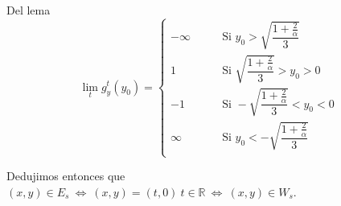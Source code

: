 \documentclass[11pt]{book}
\newcommand{\R}{{\mathbb{R}}}
\numberwithin{theorem}{subsection}
\newenvironment{proof}[1][Demostraci\'on]{\begin{trivlist}
		\item[\hskip \labelsep {\bfseries #1}]}{\end{trivlist}}
\newcommand{\qed}{\nobreak \ifvmode \relax \else
	\ifdim\lastskip<1.5em \hskip-\lastskip
	\hskip1.5em plus0em minus0.5em \fi \nobreak
	\vrule height0.75em width0.5em depth0.25em\fi}
\begin{document}
\begin{proof}{Del lema}
		\begin{equation*}
		\lim\limits_t g_y^t(y_0) = \left\lbrace \begin{aligned}
		-\infty & \qquad \text{Si } y_0 >  \sqrt{\dfrac{1 + \frac{2}{\alpha}}{3}} \\
		1 & \qquad \text{Si } \sqrt{\dfrac{1 + \frac{2}{\alpha}}{3}} > y_0 > 0 \\
		-1 & \qquad \text{Si } -\sqrt{\dfrac{1 + \frac{2}{\alpha}}{3}} < y_0 < 0 \\
		\infty & \qquad \text{Si } y_0 < -\sqrt{\dfrac{1 + \frac{2}{\alpha}}{3}} \\
		\end{aligned} \right.
		\end{equation*}
	
	Dedujimos entonces que $(x,y) \in E_s \ \Longleftrightarrow \ (x,y) = (t,0) \ t \in \R \ \Longleftrightarrow \ (x,y) \in W_s$. \qed
	
\end{proof}

\smallskip
\end{document}
